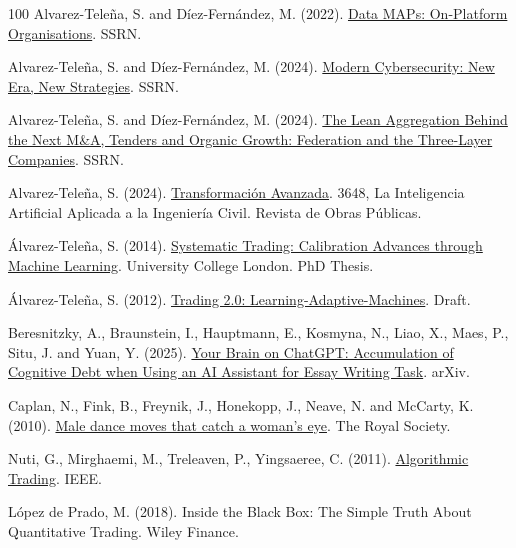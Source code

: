 \documentclass{article}
\begin{document}
\begin{thebibliography}{100}
 Alvarez-Teleña, S. and Díez-Fernández, M. (2022). \href{https://ssrn.com/abstract=4232955}{Data MAPs: On-Platform Organisations}. SSRN.

 Alvarez-Teleña, S. and Díez-Fernández, M. (2024). \href{https://ssrn.com/abstract=4957894}{Modern Cybersecurity: New Era, New Strategies}. SSRN.

 Alvarez-Teleña, S. and Díez-Fernández, M. (2024). \href{https://ssrn.com/abstract=4681784}{The Lean Aggregation Behind the Next M\&A, Tenders and Organic Growth: Federation and the Three-Layer Companies}. SSRN.

 Alvarez-Teleña, S. (2024). \href{https://www.revistadeobraspublicas.com/autor/sergio-alvarez-telena/}{Transformación Avanzada}. 3648, La Inteligencia Artificial Aplicada a la Ingeniería Civil. Revista de Obras Públicas.

 Álvarez-Teleña, S. (2014). \href{https://discovery.ucl.ac.uk/id/eprint/1461997/1/SergioAlvarez_Thesis_SystematicTrading_CAML_2014.pdf}{Systematic Trading: Calibration Advances through Machine Learning}. University College London. PhD Thesis.

 Álvarez-Teleña, S. (2012).
 \href{https://www.lulu.com/es/shop/sergio-\%C3\%A1lvarez-tele\%C3\%B1a/trading-20-learning-adaptive-machines-hard-cover/hardcover/product-18k978gv.html?page=1&pageSize=4}{Trading 2.0: Learning-Adaptive-Machines}. Draft.

 Beresnitzky, A., Braunstein, I., Hauptmann, E., Kosmyna, N., Liao, X., Maes, P., Situ, J. and Yuan, Y. (2025). \href{https://arxiv.org/abs/2506.08872}{Your Brain on ChatGPT: Accumulation of Cognitive Debt when Using an AI Assistant for Essay Writing Task}. arXiv.

 Caplan, N., Fink, B., Freynik, J., Honekopp, J., Neave, N. and McCarty, K. (2010). \href{https://www.researchgate.net/publication/46180954_Male_dance_moves_that_catch_a_woman's_eye}{Male dance moves that catch a woman's eye}. The Royal Society.

 Nuti, G., Mirghaemi, M., Treleaven, P., Yingsaeree, C. (2011). \href{https://ieeexplore.ieee.org/document/5696713/authors#authors}{Algorithmic Trading}. IEEE.

 López de Prado, M. (2018). {Inside the Black Box: The Simple Truth About Quantitative Trading}. Wiley Finance.


\end{thebibliography}
\end{document}
